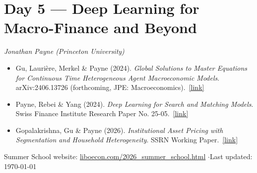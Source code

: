 \documentclass[11pt]{article}
\newcommand{\reading}[5]{%
  \item #1. \textit{#2}. #3.\ \href{#4}{[link]}%
}
\begin{document}
\section*{Day 5 --- Deep Learning for Macro-Finance and Beyond}
\textit{Jonathan Payne (Princeton University)}
\smallskip

\begin{itemize}
  \reading{Gu, Laurière, Merkel \& Payne (2024)}{Global Solutions to Master Equations for Continuous Time Heterogeneous Agent Macroeconomic Models}{arXiv:2406.13726 (forthcoming, JPE: Macroeconomics)}{https://arxiv.org/abs/2406.13726}{Introduces Economic-Model-Informed Neural Networks (EMINNs) to compute global solutions of master equations, with the continuous-time Krusell--Smith model as the lead application.}
  \reading{Payne, Rebei \& Yang (2024)}{Deep Learning for Search and Matching Models}{Swiss Finance Institute Research Paper No. 25-05}{https://ideas.repec.org/p/chf/rpseri/rp2505.html}{Underpins the search-and-matching lecture: extends the deep-learning-for-PDE approach to labor-market models with aggregate shocks and heterogeneous agents.}
  \reading{Gopalakrishna, Gu \& Payne (2026)}{Institutional Asset Pricing with Segmentation and Household Heterogeneity}{SSRN Working Paper}{https://ssrn.com/abstract=6162106}{The basis for the asset-pricing-with-household-heterogeneity lecture: a segmented heterogeneous-agent macro-finance model solved globally by deep learning, calibrated to Flow of Funds data.}
\end{itemize}

\vfill
\begin{center}
{\footnotesize\color{notegray}
Summer School website: \href{https://liboecon.com/2026_summer_school.html}{liboecon.com/2026\_summer\_school.html}
\quad$\cdot$\quad Last updated: \today}
\end{center}
\end{document}
